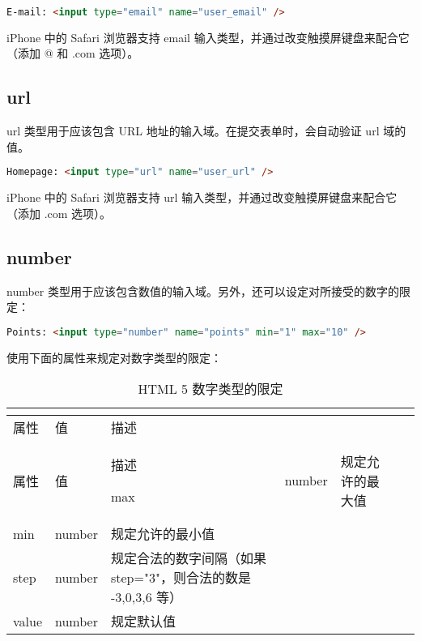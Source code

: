 \begin{lstlisting}[language=HTML]
E-mail: <input type="email" name="user_email" />
\end{lstlisting}

iPhone 中的 Safari 浏览器支持 email 输入类型，并通过改变触摸屏键盘来配合它（添加 @ 和 .com 选项）。


\subsection{url}

url 类型用于应该包含 URL 地址的输入域。在提交表单时，会自动验证 url 域的值。

\begin{lstlisting}[language=HTML]
Homepage: <input type="url" name="user_url" />
\end{lstlisting}

iPhone 中的 Safari 浏览器支持 url 输入类型，并通过改变触摸屏键盘来配合它（添加 .com 选项）。


\subsection{number}

number 类型用于应该包含数值的输入域。另外，还可以设定对所接受的数字的限定：

\begin{lstlisting}[language=HTML]
Points: <input type="number" name="points" min="1" max="10" />
\end{lstlisting}

使用下面的属性来规定对数字类型的限定：

\begin{longtable}{|p{80pt}|p{50pt}|p{200pt}|}
\tabularnewline\hline
属性	&值	&描述
\endhead

\caption{HTML 5 数字类型的限定}\\
\hline
属性	&值	&描述
\endfirsthead

\endfoot

\endlastfoot
\hline
max	&number	&规定允许的最大值\\
\hline
min	&number	&规定允许的最小值\\
\hline
step	&number	&规定合法的数字间隔（如果 step="3"，则合法的数是 -3,0,3,6 等）\\
\hline
value&number	&规定默认值\\
\hline

\end{longtable}

